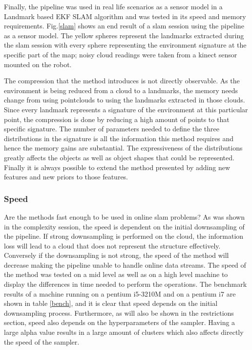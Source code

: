 \documentclass[twoside,hidelinks]{article}
\begin{document}
Finally, the pipeline was used in real life scenarios as a sensor model in a Landmark based EKF SLAM algorithm and was tested in its speed and memory requirements. Fig.\ref{slam} shows an end result of a slam session using the pipeline as a sensor model. The yellow spheres represent the landmarks extracted during the slam session with every sphere representing the environment signature at the specific part of the map; noisy cloud readings were taken from a kinect sensor mounted on the robot.


The compression that the method introduces is not directly observable. As the environment is being reduced from a cloud to a landmarks, the memory needs change from using pointclouds to using the landmarks extracted in those clouds. Since every landmark represents a signature of the environment at this particular point, the compression is done by reducing a high amount of points to that specific signature. The number of parameters needed to define the three distributions in the signature is all the information this method requires and hence the memory gains are substantial. The expressiveness of the distributions greatly affects the objects as well as object shapes that could be represented. Finally it is always possible to extend the method presented by adding new features and new priors to those features.




\subsubsection{Speed}

Are the methods fast enough to be used in online slam problems? 
As was shown in the complexity session, the speed is dependent on the initial downsampling of the pipeline. If strong downsampling is performed on the cloud, the information loss will lead to a cloud that does not represent the structure effectively. Conversely if the downsampling is not strong, the speed of the method will decrease making the pipeline unable to handle online data streams. The speed of the method was tested on a mid level as well as on a high level machine to display the differences in time needed to perform the operations. The benchmark results of a machine running on a pentium i5-3210M and on a pentium i7 are shown in table \ref{bench}, and it is clear that speed depends on the initial downsampling process. Furthermore, as will also be shown in the restrictions section, speed also depends on the hyperparameters of the sampler. Having a large alpha value results in a large amount of clusters which also affects directly the speed of the sampler.
\end{document}
